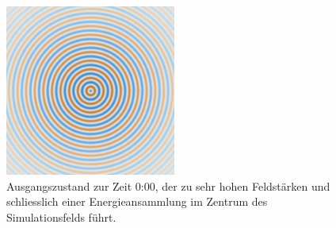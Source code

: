 \begin{figure}
    \begin{center}
        \includegraphics[width=0.5\textwidth]{papers/particles/figures/simulations/particle_frames/frame_00.png}
        \caption{Ausgangszustand zur Zeit 0:00, der zu sehr hohen Feldstärken und schliesslich einer Energieansammlung im Zentrum des Simulationsfelds führt.}\label{particles:fig:partikel:ausgangszustand}
    \end{center}
\end{figure}